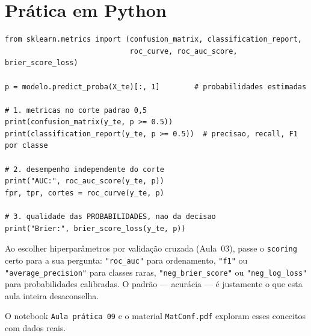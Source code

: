 \documentclass[11pt,a4paper]{article}
\begin{document}
\section{Prática em Python}
\begin{lstlisting}
from sklearn.metrics import (confusion_matrix, classification_report,
                             roc_curve, roc_auc_score, brier_score_loss)

p = modelo.predict_proba(X_te)[:, 1]        # probabilidades estimadas

# 1. metricas no corte padrao 0,5
print(confusion_matrix(y_te, p >= 0.5))
print(classification_report(y_te, p >= 0.5))  # precisao, recall, F1 por classe

# 2. desempenho independente do corte
print("AUC:", roc_auc_score(y_te, p))
fpr, tpr, cortes = roc_curve(y_te, p)

# 3. qualidade das PROBABILIDADES, nao da decisao
print("Brier:", brier_score_loss(y_te, p))
\end{lstlisting}

\begin{atencao}
Ao escolher hiperparâmetros por validação cruzada (Aula~03), passe o
\texttt{scoring} certo para a sua pergunta: \texttt{"roc\_auc"} para ordenamento,
\texttt{"f1"} ou \texttt{"average\_precision"} para classes raras,
\texttt{"neg\_brier\_score"} ou \texttt{"neg\_log\_loss"} para probabilidades
calibradas. O padrão --- acurácia --- é justamente o que esta aula inteira
desaconselha.
\end{atencao}

O notebook \texttt{Aula prática 09} e o material \texttt{MatConf.pdf} exploram esses
conceitos com dados reais.

\end{document}
